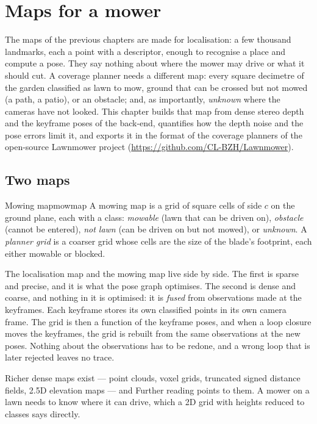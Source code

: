 \chapter{Maps for a mower}
\label{ch:maps}

The maps of the previous chapters are made for localisation: a few
thousand landmarks, each a point with a descriptor, enough to recognise
a place and compute a pose. They say nothing about where the mower may
drive or what it should cut. A coverage planner needs a different map:
every square decimetre of the garden classified as lawn to mow, ground
that can be crossed but not mowed (a path, a patio), or an obstacle;
and, as importantly, \emph{unknown} where the cameras have not looked.
This chapter builds that map from dense stereo depth and the keyframe
poses of the back-end, quantifies how the depth noise and the pose
errors limit it, and exports it in the format of the coverage planners
of the open-source Lawnmower project
(\url{https://github.com/CL-BZH/Lawnmower}).

\section{Two maps}

\begin{definition}{Mowing map}{mowmap}
A mowing map is a grid of square cells of side $c$ on the ground plane,
each with a class: \emph{mowable} (lawn that can be driven on),
\emph{obstacle} (cannot be entered), \emph{not lawn} (can be driven on
but not mowed), or \emph{unknown}. A \emph{planner grid} is a coarser
grid whose cells are the size of the blade's footprint, each either
mowable or blocked.
\end{definition}

The localisation map and the mowing map live side by side. The first is
sparse and precise, and it is what the pose graph optimises. The second
is dense and coarse, and nothing in it is optimised: it is \emph{fused}
from observations made at the keyframes. Each keyframe stores its own
classified points in its own camera frame. The grid is then a function
of the keyframe poses, and when a loop closure moves the keyframes, the
grid is rebuilt from the same observations at the new poses. Nothing
about the observations has to be redone, and a wrong loop that is later
rejected leaves no trace.

Richer dense maps exist --- point clouds, voxel grids, truncated signed
distance fields, 2.5D elevation maps --- and Further reading points to
them. A mower on a lawn needs to know where it can drive, which a 2D
grid with heights reduced to classes says directly.

